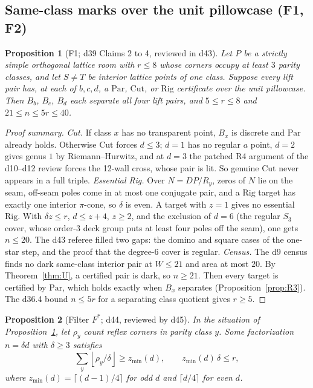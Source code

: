 \documentclass[11pt]{article}
\newtheorem{proposition}{Proposition}
\theoremstyle{definition}
\theoremstyle{remark}
\newcommand{\Par}{\mathrm{Par}}
\newcommand{\Rig}{\mathrm{Rig}}
\newcommand{\Cut}{\mathrm{Cut}}
\begin{document}
\subsection{Same-class marks over the unit pillowcase (F1, F2)}

\begin{proposition}[F1; d39 Claims 2 to 4, reviewed in d43]\label{prop:F1}
Let $P$ be a strictly simple orthogonal lattice room with $r\le 8$ whose
corners occupy at least $3$ parity classes, and let $S\ne T$ be interior
lattice points of one class. Suppose every lift pair has, at each of $b,c,d$, a
$\Par$, $\Cut$, or $\Rig$ certificate over the unit pillowcase. Then $B_b$,
$B_c$, $B_d$ each separate all four lift pairs, and $5\le r\le 8$ and
$21\le n\le 5r\le 40$.
\end{proposition}

\begin{proof}[Proof summary]
\emph{Cut.} If class $x$ has no transparent point, $B_x$ is discrete and
$\Par$ already holds. Otherwise $\Cut$ forces $d\le 3$; $d=1$ has no regular
$a$ point, $d=2$ gives genus $1$ by Riemann--Hurwitz, and at $d=3$ the
patched R4 argument of the d10--d12 review forces the 12-wall cross, whose
pair is lit. So genuine $\Cut$ never appears in a full triple.
\emph{Essential Rig.} Over $N=DP/R_y$, zeros of $N$ lie on the seam, off-seam
poles come in at most one conjugate pair, and a $\Rig$ target has exactly one
interior $\pi$-cone, so $\delta$ is even. A target with $z=1$ gives no
essential $\Rig$. With $\delta z\le r$, $d\le z+4$, $z\ge 2$, and the exclusion
of $d=6$ (the regular $S_3$ cover, whose order-$3$ deck group puts at least
four poles off the seam), one gets $n\le 20$. The d43 referee filled two gaps:
the domino and square cases of the one-star step, and the proof that the
degree-$6$ cover is regular.
\emph{Census.} The d9 census finds no dark same-class interior pair at
$W\le 21$ and area at most $20$. By Theorem~\ref{thm:U}, a certified pair is
dark, so $n\ge 21$. Then every target is certified by $\Par$, which holds
exactly when $B_x$ separates (Proposition~\ref{prop:R3}). The d36.4 bound
$n\le 5r$ for a separating class quotient gives $r\ge 5$.
\end{proof}

\begin{proposition}[Filter $F^*$; d44, reviewed by d45]\label{prop:Fstar}
In the situation of Proposition~\ref{prop:F1}, let $\rho_y$ count reflex
corners in parity class $y$. Some factorization $n=\delta d$ with
$\delta\ge 3$ satisfies
\[
\sum_y\left\lfloor\rho_y/\delta\right\rfloor\ge z_{\min}(d),\qquad
z_{\min}(d)\,\delta\le r,
\]
where $z_{\min}(d)=\lceil (d-1)/4\rceil$ for odd $d$ and $\lceil d/4\rceil$ for
even $d$.
\end{proposition}
\end{document}
